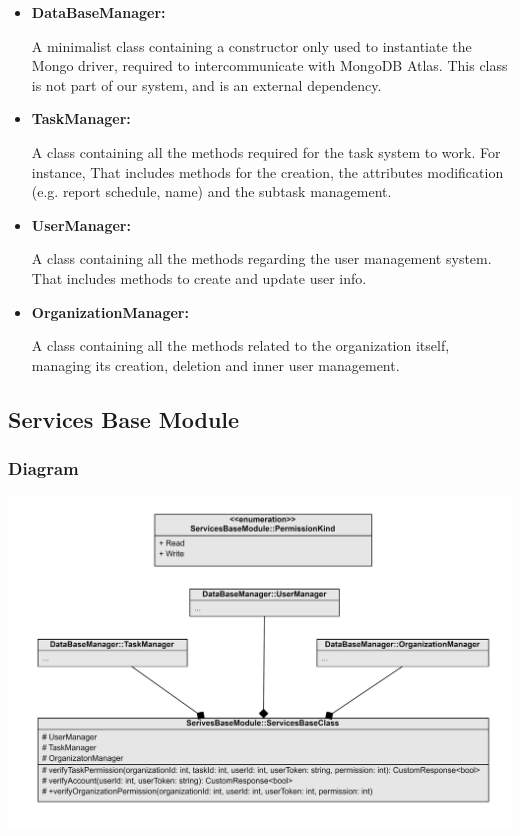 \documentclass{article}
\begin{document}
\begin{itemize}
  \item \textbf{DataBaseManager: }
  
  A minimalist class containing a constructor only used to instantiate the Mongo driver, required to intercommunicate with MongoDB Atlas.
  This class is not part of our system, and is an external dependency.

  \item \textbf{TaskManager: }
  
  A class containing all the methods required for the task system to work. For instance, That includes methods for the creation, the attributes modification (e.g. report schedule, name) and the subtask management.

  \item \textbf{UserManager: }
  
  A class containing all the methods regarding the user management system. That includes methods to create and update user info.

  \item \textbf{OrganizationManager: }
  
  A class containing all the methods related to the organization itself, managing its creation, deletion and inner user management.

\end{itemize}


\subsection{Services Base Module}

\subsubsection{Diagram}

\includegraphics[width=\textwidth,height=\textheight,keepaspectratio]{images/class_diagram/services_base_.jpg}
\end{document}
